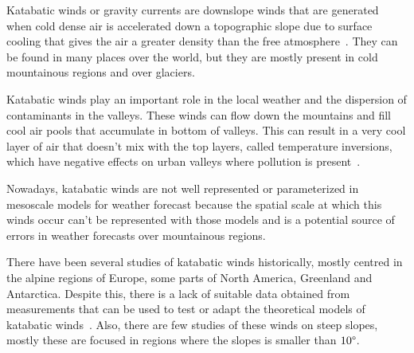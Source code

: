 Katabatic winds or gravity currents are downslope winds that are generated when cold dense air is accelerated down a topographic slope due to surface cooling that gives the air a greater density than the free atmosphere~\citep{poulos2008observational}. They can be found in many places over the world, but they are mostly present in cold mountainous regions and over glaciers. 

Katabatic winds play an important role in the local weather and the dispersion of contaminants in the valleys. These winds can flow down the mountains and fill cool air pools that accumulate in bottom of valleys. This can result in a very cool layer of air that doesn't mix with the top layers, called temperature inversions, which have negative effects on urban valleys where pollution is present~\citep{largeron2016persistent}.

Nowadays, katabatic winds are not well represented or parameterized in mesoscale models for weather forecast because the spatial scale at which this winds occur can't be represented with those models and is a potential source of errors in weather forecasts over mountainous regions. 

There have been several studies of katabatic winds historically, mostly centred in the alpine regions of Europe, some parts of North America, Greenland and Antarctica. Despite this, there is a lack of suitable data obtained from measurements that can be used to test or adapt the theoretical models of katabatic winds~\citep{manins1979katabatic}. Also, there are few studies of these winds on steep slopes, mostly these are focused in regions where the slopes is smaller than $10 \degree$.